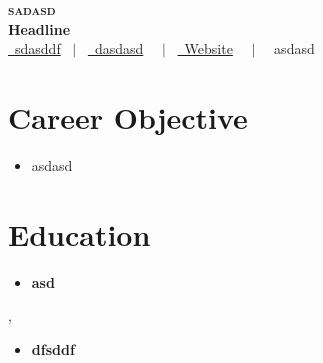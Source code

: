 \documentclass[letterpaper,5pt]{article}
\begin{document}
    
    \begin{center}
      \textbf{\Huge \scshape sadasd} \\ \vspace{5pt}
      \textbf{\large Headline} \\ \vspace{2pt}
      \href{mailto:sdasddf}{\raisebox{-0.05\height}\faEnvelope \ sdasddf} 
      \ $|$ \ \href{tel:dasdasd}{\raisebox{-0.05\height}\faMobile \ dasdasd}  \
      \ $|$ \ \href{sasdad}{\raisebox{-0.05\height}\faGlobe \ Website}  \
      \ $|$ \ {\raisebox{-0.05\height}\faMapMarker \ asdasd} \ \
    \end{center}
    
      \section{Career Objective}
        \begin{itemize}[leftmargin=0.15in, label={}]
          \item{asdasd}
        \end{itemize}
    
    \section{Education}
      
      
        \begin{itemize}[leftmargin=0.15in, label={}]
        \item[]
          \textbf{ asd } \hfill  \\
          \textit{    } \hfill  
        \end{itemize}
        \vspace{-15pt}
      ,
        \begin{itemize}[leftmargin=0.15in, label={}]
        \item[]
          \textbf{ dfsddf } \hfill  \\
          \textit{    } \hfill  
        \end{itemize}
        \vspace{-15pt}
      
      \vspace{10mm}
    
    \vspace*{-10.5mm}  
\end{document}
